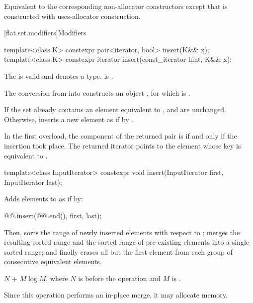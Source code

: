 \begin{itemdescr}
\pnum
\effects
Equivalent to the corresponding non-allocator constructors
except that  is constructed with
uses-allocator construction.
\end{itemdescr}

[flat.set.modifiers]{Modifiers}

%
\begin{itemdecl}
template<class K> constexpr pair<iterator, bool> insert(K&& x);
template<class K> constexpr iterator insert(const_iterator hint, K&& x);
\end{itemdecl}

\begin{itemdescr}
\pnum
\constraints
The  
is valid and denotes a type.
 is .

\pnum
\expects
The conversion from  into  constructs
an object , for which  is .

\pnum
\effects
If the set already contains an element equivalent to ,
 and  are unchanged.
Otherwise,
inserts a new element as if by .

\pnum
\returns
In the first overload,
the  component of the returned pair is 
if and only if the insertion took place.
The returned iterator points to the element
whose key is equivalent to .
\end{itemdescr}

%
\begin{itemdecl}
template<class InputIterator>
  constexpr void insert(InputIterator first, InputIterator last);
\end{itemdecl}

\begin{itemdescr}
\pnum
\effects
Adds elements to  as if by:
\begin{codeblock}
@@.insert(@@.end(), first, last);
\end{codeblock}
Then,
sorts the range of newly inserted elements with respect to ;
merges the resulting sorted range and
the sorted range of pre-existing elements into a single sorted range; and
finally erases all but the first element
from each group of consecutive equivalent elements.

\pnum
\complexity
$N$ + $M \log M$, where $N$ is  before the operation and
$M$ is .

\pnum
\remarks
Since this operation performs an in-place merge, it may allocate memory.
\end{itemdescr}

